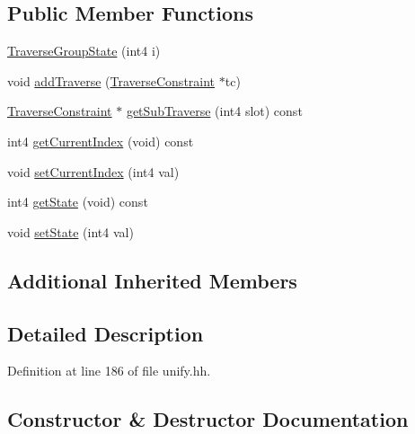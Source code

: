 \subsection*{Public Member Functions}
\begin{DoxyCompactItemize}
\item 
\mbox{\hyperlink{class_traverse_group_state_a44ccab290f043e4ebbf0d044889c77c9}{Traverse\+Group\+State}} (int4 i)
\item 
void \mbox{\hyperlink{class_traverse_group_state_a109db15fd054bab84cc082d99bf7198a}{add\+Traverse}} (\mbox{\hyperlink{class_traverse_constraint}{Traverse\+Constraint}} $\ast$tc)
\item 
\mbox{\hyperlink{class_traverse_constraint}{Traverse\+Constraint}} $\ast$ \mbox{\hyperlink{class_traverse_group_state_a34635e24c1d4257230d35a91c4a2f8c9}{get\+Sub\+Traverse}} (int4 slot) const
\item 
int4 \mbox{\hyperlink{class_traverse_group_state_abc063312ff36fc451aee50b86e4369d8}{get\+Current\+Index}} (void) const
\item 
void \mbox{\hyperlink{class_traverse_group_state_a33d84f4d418ea6e16a41a8263a8565ac}{set\+Current\+Index}} (int4 val)
\item 
int4 \mbox{\hyperlink{class_traverse_group_state_a78f0b4d20a459ba025d77ba93fbe1d55}{get\+State}} (void) const
\item 
void \mbox{\hyperlink{class_traverse_group_state_a6d4c89aea1bb414859c86cac2b7ee11c}{set\+State}} (int4 val)
\end{DoxyCompactItemize}
\subsection*{Additional Inherited Members}


\subsection{Detailed Description}


Definition at line 186 of file unify.\+hh.



\subsection{Constructor \& Destructor Documentation}
\mbox{\label{class_traverse_group_state_a44ccab290f043e4ebbf0d044889c77c9}} 
